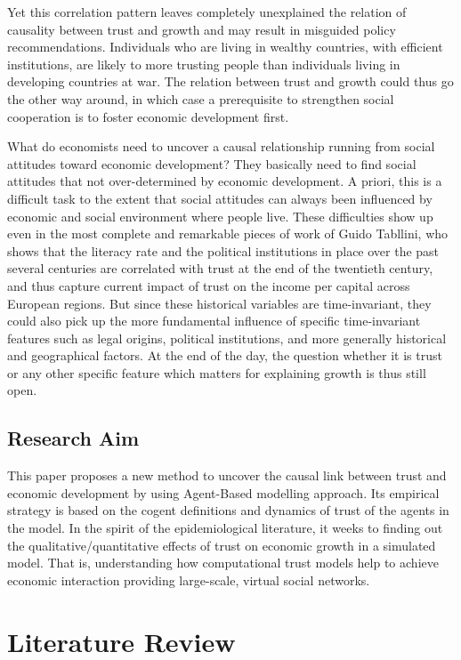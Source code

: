 \documentclass[11pt]{article}
\begin{document}
Yet this correlation pattern leaves completely unexplained the relation of causality between trust and growth and may result in misguided policy recommendations. Individuals who are living in wealthy countries, with efficient institutions, are likely to more trusting people than individuals living in developing countries at war. The relation between trust and growth could thus go the other way around, in which case a prerequisite to strengthen social cooperation is to foster economic development first.

What do economists need to uncover a causal relationship running from social attitudes toward economic development? They basically need to find social attitudes that not over-determined by economic development. A priori, this is a difficult task to the extent that social attitudes can always been influenced by economic and social environment where people live. These difficulties show up even in the most complete and remarkable pieces of work of Guido Tabllini, who shows that the literacy rate and the political institutions in place over the past several centuries are correlated with trust at the end of the twentieth century, and thus capture current impact of trust on the income per capital across European regions. But since these historical variables are time-invariant, they could also pick up the more fundamental influence of specific time-invariant features such as legal origins, political institutions, and more generally historical and geographical factors. At the end of the day, the question whether it is trust or any other specific feature which matters for explaining growth is thus still open.

\subsection{Research Aim}

This paper proposes a new method to uncover the causal link between trust and economic development by using Agent-Based modelling approach. Its empirical strategy is based on the cogent definitions and dynamics of trust of the agents in the model. In the spirit of the epidemiological literature, it weeks to finding out the qualitative/quantitative effects of trust on economic growth in a simulated model. That is, understanding how computational trust models help to achieve economic interaction providing large-scale, virtual social networks.


\section{Literature Review}
\end{document}
